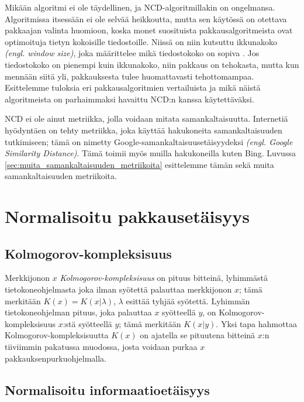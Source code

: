 \documentclass[12pt,finnish]{tktltiki2}
\theoremstyle{definition}
\theoremstyle{remark}
\newcommand{\engl}[1]{\emph{(engl. #1)}}
\newcommand{\kolmogorov}{Kolmogorov-kompleksisuus}
\begin{document}
  Mikään algoritmi ei ole täydellinen, ja NCD-algoritmillakin on ongelmansa.
  Algoritmissa itsessään ei ole selvää heikkoutta, mutta sen käytössä on otettava pakkaajan valinta huomioon, koska monet suosituista pakkausalgoritmeista ovat optimoituja tietyn kokoisille tiedostoille.
  Niissä on niin kutsuttu ikkunakoko \engl{window size}, joka määrittelee mikä tiedostokoko on sopiva \cite{cebrian2005common}.
  Jos tiedostokoko on pienempi kuin ikkunakoko, niin pakkaus on tehokasta, mutta kun mennään siitä yli, pakkauksesta tulee huomattavasti tehottomampaa.
  Esittelemme tuloksia eri pakkausalgoritmien vertailuista ja mikä näistä algoritmeista on parhaimmaksi havaittu NCD:n kanssa käytettäväksi.


\label{par:intro-5}
  NCD ei ole ainut metriikka, jolla voidaan mitata samankaltaisuutta.
  Internetiä hyödyntäen on tehty metriikka, joka käyttää hakukoneita samankaltaisuuden tutkimiseen; tämä on nimetty Google-samankaltaisuusetäisyydeksi \engl{Google Similarity Distance}.
  Tämä toimii myös muilla hakukoneilla kuten Bing. Luvussa \ref{sec:muita_samankaltaisuuden_metriikoita} esittelemme tämän sekä muita samankaltaisuuden metriikoita.


\section{Normalisoitu pakkausetäisyys} %
\label{sec:normalisoitu_pakkausetaisyys}
  \subsection{\kolmogorov} %
\label{sub:kolmogorov_kompleksisuus}

  Merkkijonon $x$ \emph{\kolmogorov} on pituus bitteinä, lyhimmästä tietokoneohjelmasta joka ilman syötettä palauttaa merkkijonon $x$; tämä merkitään $K(x)=K(x|\lambda)$, $\lambda$ esittää tyhjää syötettä.
  Lyhimmän tietokoneohjelman pituus, joka palauttaa $x$ syötteellä $y$, on \kolmogorov{} $x$:stä syötteellä $y$; tämä merkitään $K(x|y)$.
  Yksi tapa hahmottaa Kolmogorov-kompleksisuutta $K(x)$ on ajatella se pituutena bitteinä $x$:n tiiviimmin pakatussa muodossa, josta voidaan purkaa $x$ pakkauksenpurkuohjelmalla.

\subsection{Normalisoitu informaatioetäisyys} %
\label{sub:normalisoitu_informaatioetaisyys}
\end{document}
